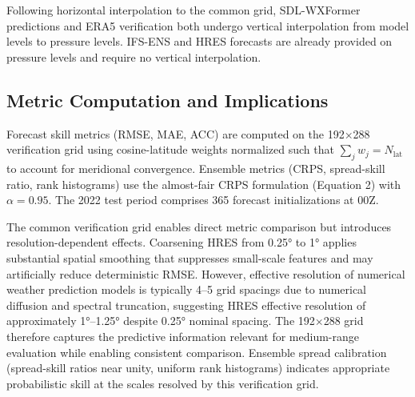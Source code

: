 \documentclass[11pt]{article}
\begin{document}
Following horizontal interpolation to the common grid, SDL-WXFormer predictions and ERA5 verification both undergo vertical interpolation from model levels to pressure levels. IFS-ENS and HRES forecasts are already provided on pressure levels and require no vertical interpolation.

\subsection{Metric Computation and Implications}

Forecast skill metrics (RMSE, MAE, ACC) are computed on the 192×288 verification grid using cosine-latitude weights normalized such that $\sum_{j} w_j = N_{\text{lat}}$ to account for meridional convergence. Ensemble metrics (CRPS, spread-skill ratio, rank histograms) use the almost-fair CRPS formulation (Equation 2) with $\alpha = 0.95$. The 2022 test period comprises 365 forecast initializations at 00Z.

The common verification grid enables direct metric comparison but introduces resolution-dependent effects. Coarsening HRES from 0.25° to 1° applies substantial spatial smoothing that suppresses small-scale features and may artificially reduce deterministic RMSE. However, effective resolution of numerical weather prediction models is typically 4–5 grid spacings due to numerical diffusion and spectral truncation, suggesting HRES effective resolution of approximately 1°–1.25° despite 0.25° nominal spacing. The 192×288 grid therefore captures the predictive information relevant for medium-range evaluation while enabling consistent comparison. Ensemble spread calibration (spread-skill ratios near unity, uniform rank histograms) indicates appropriate probabilistic skill at the scales resolved by this verification grid.



\end{document}
